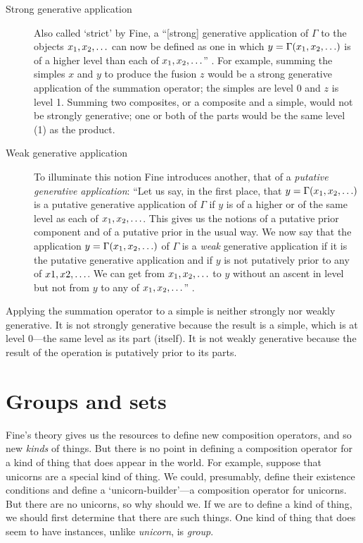 \documentclass[11pt]{article}
\begin{document}
\begin{spacing}{1.5}
\begin{description}
  \item[Strong generative application] Also called `strict' by Fine, a
    ``[strong] generative application of $\Gamma$ to the objects $x_1,
    x_2, \mathellipsis$ can now be defined as one in which $y = \Gamma
    (x_1, x_2, \mathellipsis )$ is of a higher level than each of
    $x_1, x_2, \mathellipsis$'' \citeyearpar[584]{fine2010}.  For
    example, summing the simples $x$ and $y$ to produce the fusion $z$
    would be a strong generative application of the summation
    operator; the simples are level 0 and $z$ is level 1.  Summing two
    composites, or a composite and a simple, would not be strongly
    generative; one or both of the parts would be the same level (1)
    as the product.
  \item[Weak generative application] To illuminate this notion Fine
    introduces another, that of a {\em putative generative
      application}: ``Let us say, in the first place, that $y = \Gamma
    (x_1, x_2, \mathellipsis )$ is a putative generative application
    of $\Gamma$ if $y$ is of a higher or of the same level as each of
    $x_1, x_2, \mathellipsis$.  This gives us the notions of a
    putative prior component and of a putative prior in the usual way.
    We now say that the application $y = \Gamma (x_1, x_2,
    \mathellipsis )$ of $\Gamma$ is a {\em weak} generative
    application if it is the putative generative application and if
    $y$ is not putatively prior to any of $x1, x2, \mathellipsis$.  We
    can get from $x_1, x_2, \mathellipsis$ to $y$ without an ascent in
    level but not from $y$ to any of $x_1, x_2, \mathellipsis$''
    \citeyearpar[584]{fine2010}.
\end{description}

Applying the summation operator to a simple is neither strongly nor
weakly generative.  It is not strongly generative because the result
is a simple, which is at level 0---the same level as its part
(itself).  It is not weakly generative because the result of the
operation is putatively prior to its parts.

\section{Groups and sets}
\label{group}
Fine's theory gives us the resources to define new composition
operators, and so new {\em kinds} of things.  But there is no point in
defining a composition operator for a kind of thing that does appear
in the world.  For example, suppose that unicorns are a special kind
of thing.  We could, presumably, define their existence conditions and
define a `unicorn-builder'---a composition operator for unicorns.  But
there are no unicorns, so why should we.  If we are to define a kind
of thing, we should first determine that there are such things.  One
kind of thing that does seem to have instances, unlike {\em unicorn},
is {\em group}.


\end{spacing}
\end{document}
